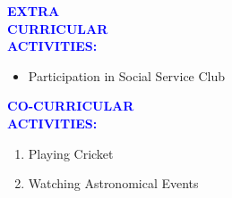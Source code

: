 \documentclass{article}
\begin{document}
\begin{flushleft}
	\textcolor{blue}{\textbf{EXTRA\\ CURRICULAR\\ ACTIVITIES:}}
	\begin{itemize}
		\vspace{-0.29in}
		\addtolength{\itemindent}{1.0in}
		\item Participation in Social Service Club 
	\end{itemize}
\end{flushleft}
\begin{flushleft}
	\textcolor{blue}{\textbf{CO-CURRICULAR\\ ACTIVITIES:}}
	\begin{enumerate}
		\vspace{-0.29in}
		\addtolength{\itemindent}{1.0in}
		\item Playing Cricket
		\item Watching Astronomical Events
	\end{enumerate}
\end{flushleft}
\end{document}
